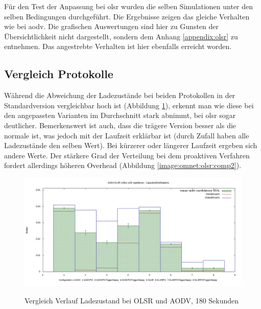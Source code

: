 Für den Test der Anpassung bei \gls{olsr} wurden die selben Simulationen unter den selben Bedingungen durchgeführt. Die Ergebnisse zeigen das gleiche Verhalten wie bei \gls{aodv}. Die grafischen Auswertungen sind hier zu Gunsten der Übersichtlichkeit nicht dargestellt, sondern dem Anhang \ref{appendix:olsr} zu entnehmen. Das angestrebte Verhalten ist hier ebenfalls erreicht worden.

\subsection{Vergleich Protokolle}
\label{chapter:auswertung:vergleich}

Während die Abweichung der Ladezustände bei beiden Protokollen in der Standardversion vergleichbar hoch ist (Abbildung \ref{image:omnet:olsr:comp1}), erkennt man wie diese bei den angepassten Varianten im Durchschnitt stark abnimmt, bei \gls{olsr} sogar deutlicher. Bemerkenswert ist auch, dass die trägere Version besser als die normale ist, was jedoch mit der Laufzeit erklärbar ist (durch Zufall haben alle Ladezustände den selben Wert). Bei kürzerer oder längerer Laufzeit ergeben sich andere Werte. Der stärkere Grad der Verteilung bei dem proaktiven Verfahren fordert allerdings höheren Overhead (Abbildung \ref{image:omnet:olsr:comp2}).\newline

\begin{figure}
  \centering
  \includegraphics[scale=0.5]{bilder/c1.png} \\
  \caption{Vergleich Verlauf Ladezustand bei OLSR und AODV, 180 Sekunden}
  \label{image:omnet:olsr:comp1}
\end{figure}


